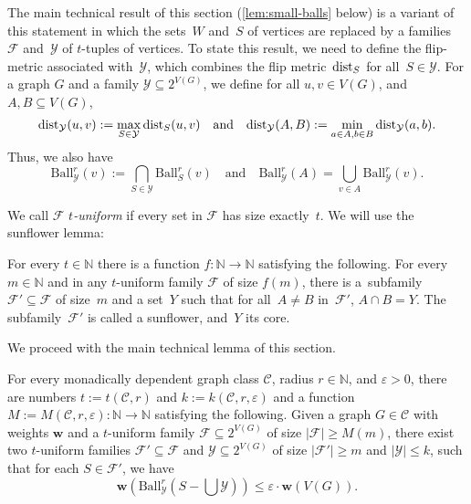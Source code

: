 \documentclass[a4paper,UKenglish,cleveref, autoref, thm-restate]{lipics-v2021}
\newcommand{\eps}{\varepsilon}
\newcommand{\YY}{\mathcal{Y}}
\newcommand{\N}[0]{\mathrm{\mathbb{N}}}
\renewcommand{\subset}{\subseteq}
\newcommand{\dist}{\textnormal{dist}}
\newcommand{\weight}{\mathbf{w}}
\newcommand{\CC}{\mathcal{C}}
\newcommand{\FF}{\mathcal{F}}
\renewcommand{\le}{\leqslant}
\renewcommand{\leq}{\le}
\renewcommand{\ge}{\geqslant}
\renewcommand{\geq}{\ge}
\newcommand{\Ball}{\mathrm{Ball}}
\begin{document}
The main technical result of this section (\cref{lem:small-balls} below) is a variant of this statement in which the sets~$W$ and~$S$ of vertices are replaced by a families~$\FF$ and~$\YY$ of $t$-tuples of vertices.
To state this result, we need to define the flip-metric associated with~$\YY$, which combines the flip metric~$\dist_S$ for all~$S \in \YY$.
For a graph $G$ and a family $\YY \subseteq 2^{V(G)}$, we define for all $u,v\in V(G)$, and $A,B \subseteq V(G)$,
\[
    \dist_\YY(u,v) := \max_{S \in \YY} \dist_S(u,v)
    \quad
    \text{and}
    \quad
    \dist_\YY(A,B) := \min_{a\in A, b\in B} \dist_\YY(a,b).
\]
Thus, we also have
\[
    \Ball_\YY^r(v) := \bigcap_{S \in \YY} \Ball_S^r(v)
    \quad
    \text{and}
    \quad
    \Ball_\YY^r(A) = \bigcup_{v\in A} \Ball_\YY^r(v).
\]


We call $\FF$ \emph{$t$-uniform} if every set in $\FF$ has size exactly~$t$. We will use the sunflower lemma:
\begin{theorem}\label{lem:sunflower}
  For every $t \in \N$ there is a function $f:\N \to \N$ satisfying the following.
  For every $m \in \N$ and in any $t$-uniform family $\FF$ of size $f(m)$, there is a~subfamily $\FF' \subset \FF$ of size~$m$ and a set~$Y$ such that for all~$A \neq B$ in~$\FF'$, $A \cap B = Y$.
  The subfamily~$\FF'$ is called a sunflower, and~$Y$ its core.
\end{theorem}











We proceed with the main technical lemma of this section.

\begin{lemma}\label{lem:small-balls}
    For every monadically dependent graph class $\CC$,  radius $r \in \N$, and $\eps >0$, there are numbers $t := t(\CC,r)$ and $k := k(\CC, r, \eps)$ and a function $M := M(\CC,r,\eps) : \N \to \N$ satisfying the following.
    Given a graph $G\in\CC$ with weights $\weight$ and a $t$-uniform family $\FF \subseteq 2^{V(G)}$ of size $|\FF| \geq M(m)$,
    there exist two $t$-uniform families $\FF' \subseteq \FF$ and $\YY \subseteq 2^{V(G)}$ of size $|\FF'| \geq m$ and $|\YY| \leq k$,
    such that for each $S \in \FF'$, we have
    \[
        \weight(\Ball^r_\YY(S- \textstyle{\bigcup \YY})) \leq \eps \cdot \weight (V(G)).
    \]
\end{lemma}
\end{document}
